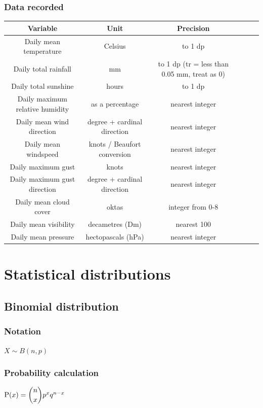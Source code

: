 \documentclass[A4paper]{article}
\begin{document}
	\subsubsection{Data recorded}
	\begin{tabular}{|c|c|c|c|c|c|}
		\hline
		\textbf{Variable} & \textbf{Unit} & \textbf{Precision}\\
		\hline
		Daily mean temperature & Celsius & to 1 dp\\
		\hline
		Daily total rainfall & mm & to 1 dp (tr = less than 0.05 mm, treat as 0)\\
		\hline
		Daily total sunshine & hours & to 1 dp \\
		\hline
		Daily maximum relative humidity & as a percentage & nearest integer \\
		\hline
		Daily mean wind direction & degree + cardinal direction & nearest integer  \\
		\hline
		Daily mean windspeed & knots / Beaufort conversion & nearest integer \\
		\hline
		Daily maximum gust & knots & nearest integer   \\
		\hline
		Daily maximum gust direction & degree + cardinal direction & nearest integer   \\
		\hline
		Daily mean cloud cover & oktas  & integer from 0-8   \\
		\hline
		Daily mean visibility & decametres (Dm) & nearest 100  \\
		\hline
		Daily mean pressure & hectopascals (hPa) & nearest integer  \\
		\hline
	\end{tabular}
	
	
	\pagebreak
	

	
	\section{Statistical distributions}
	\subsection{Binomial distribution}
	\subsubsection{Notation}
	$X \sim B(n,p)$
	\subsubsection{Probability calculation}
	$\text{P}(x) = \dbinom{n}{x} p^x q^{n-x}$
\end{document}

